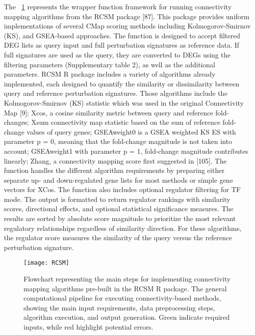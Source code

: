 The ~\ref{fig:fig5} represents the wrapper function framework for running connectivity mapping algorithms from the RCSM package [87]. This package provides uniform implementations of several CMap scoring methods including Kolmogorov-Smirnov (KS), and GSEA-based approaches. The function is designed to accept filtered DEG lists as query input and full perturbation signatures as reference data. If full signatures are used as the query, they are converted to DEGs using the filtering parameters (Supplementary table 2), as well as the additional parameters. RCSM R package includes a variety of algorithms already implemented, each designed to quantify the similarity or dissimilarity between query and reference perturbation signatures. Those algorithms include the Kolmogorov-Smirnov (KS) statistic which was used in the original Connectivity Map [9]; Xcos, a cosine similarity metric between query and reference fold-changes; Xsum connectivity map statistic based on the sum of reference fold-change values of query genes; GSEAweight0 is a GSEA weighted KS  ES with parameter p = 0, meaning that the fold-change magnitude is not taken into account; GSEAweight1 with parameter p = 1, fold-change magnitude contributes linearly; Zhang, a connectivity mapping score first suggested in [105].
The function handles the different algorithm requirements by preparing either separate up- and down-regulated gene lists for most methods or simple gene vectors for XCos. The function also includes optional regulator filtering for TF mode. The output is formatted to return regulator rankings with similarity scores, directional effects, and optional statistical significance measures. The results are sorted by absolute score magnitude to prioritize the most relevant regulatory relationships regardless of similarity direction. For these algorithms, the regulator score measures the similarity of the query versus the reference perturbation signature.

\begin{figure}[htbp]
    \centering
    \texttt{[image: RCSM]}
    \caption{Flowchart representing the main steps for implementing connectivity mapping algorithms pre-built in the RCSM R package. The general computational pipeline for executing connectivity-based methods, showing the main input requirements, data preprocessing steps, algorithm execution, and output generation. Green indicate required inputs, while red highlight potential errors.}
    \label{fig:fig5}
\end{figure}



